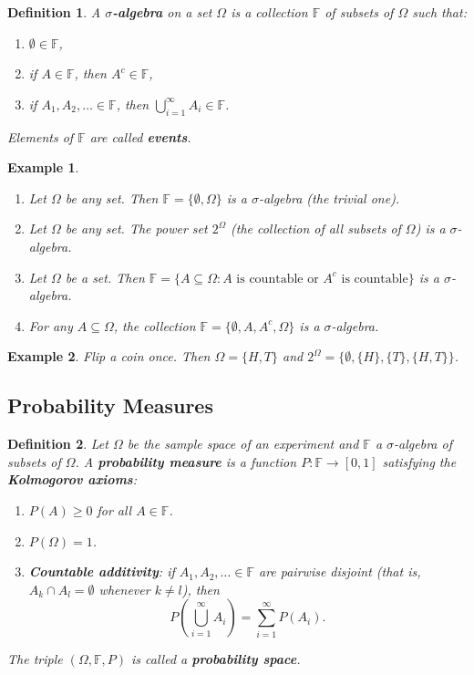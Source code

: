 \documentclass{article}
\newtheorem{definition}{Definition}
\newtheorem*{example}{Example}
\begin{document}
\begin{definition}
A \textbf{$\sigma$-algebra} on a set $\Omega$ is a collection $\mathbb{F}$ of subsets of $\Omega$ such that:
\begin{enumerate}
    \item $\emptyset \in \mathbb{F}$,
    \item if $A \in \mathbb{F}$, then $A^c \in \mathbb{F}$,
    \item if $A_1, A_2, \ldots \in \mathbb{F}$, then $\bigcup_{i=1}^\infty A_i \in \mathbb{F}$.
\end{enumerate}
Elements of $\mathbb{F}$ are called \textbf{events}.
\end{definition}

\begin{example}\
\begin{enumerate}
    \item Let $\Omega$ be any set. Then $\mathbb{F} = \{\emptyset, \Omega\}$ is a $\sigma$-algebra (the trivial one).
    \item Let $\Omega$ be any set. The power set $2^\Omega$ (the collection of all subsets of $\Omega$) is a $\sigma$-algebra.
    \item Let $\Omega$ be a set. Then $\mathbb{F} = \{A \subseteq \Omega : A \text{ is countable or } A^c \text{ is countable}\}$ is a $\sigma$-algebra.
    \item For any $A \subseteq \Omega$, the collection $\mathbb{F} = \{\emptyset, A, A^c, \Omega\}$ is a $\sigma$-algebra.
\end{enumerate}
\end{example}

\begin{example}
Flip a coin once. Then $\Omega = \{H, T\}$ and $2^\Omega = \{\emptyset, \{H\}, \{T\}, \{H, T\}\}$.
\end{example}

\subsection{Probability Measures}

\begin{definition}
Let $\Omega$ be the sample space of an experiment and $\mathbb{F}$ a $\sigma$-algebra of subsets of $\Omega$. A \textbf{probability measure} is a function $P : \mathbb{F} \to [0, 1]$ satisfying the \textbf{Kolmogorov axioms}:
\begin{enumerate}
    \item $P(A) \geq 0$ for all $A \in \mathbb{F}$.
    \item $P(\Omega) = 1$.
    \item \textbf{Countable additivity}: if $A_1, A_2, \ldots \in \mathbb{F}$ are pairwise disjoint (that is, $A_k \cap A_l = \emptyset$ whenever $k \neq l$), then
    \[
    P\!\left(\bigcup_{i=1}^\infty A_i\right) = \sum_{i=1}^\infty P(A_i).
    \]
\end{enumerate}
The triple $(\Omega, \mathbb{F}, P)$ is called a \textbf{probability space}.
\end{definition}
\end{document}
